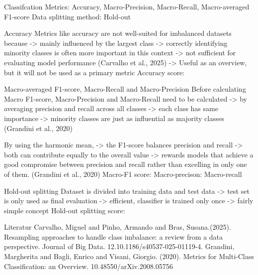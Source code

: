 Classifcation Metrics: Accuracy, Macro-Precision, Macro-Recall, Macro-averaged F1-score
Data splitting method: Hold-out

 

{Accuracy}
Metrics like accuracy are not well-suited for imbalanced datasets because
-> mainly influenced by the largest class 
-> correctly identifying minority classes is often more important in this context
-> not sufficient for evaluating model performance 
(Carvalho et al., 2025)
-> Useful as an overview, but it will not be used as a primary metric
Accuracy score:


{Macro-averaged F1-score, Macro-Recall and Macro-Precision}
Before calculating Macro F1-score, Macro-Precision and Macro-Recall need to be calculated
-> by averaging precision and recall across all classes 
-> each class has same importance 
-> minority classes are just as influential as majority classes
(Grandini et al., 2020)


By using the harmonic mean, 
-> the F1-score balances precision and recall 
-> both can contribute equally to the overall value
-> rewards models that achieve a good compromise between precision and recall rather than 
excelling in only one of them. 
(Grandini et al., 2020)
Macro-F1 score:
Macro-precison:
Macro-recall

{Hold-out splitting}
Dataset is divided into training data and  test data
-> test set is only used as final evaluation
-> efficient, classifier is trained only once
-> fairly simple concept
Hold-out splitting score:

{Literatur}
Carvalho, Miguel and Pinho, Armando and Bras, Susana.(2025). Resampling approaches to handle class 
imbalance: a review from a data perspective. Journal of Big Data. 12.10.1186/s40537-025-01119-4.
Grandini, Margherita and Bagli, Enrico and Visani, Giorgio. (2020). Metrics for Multi-Class 
Classification: an Overview. 10.48550/arXiv.2008.05756


